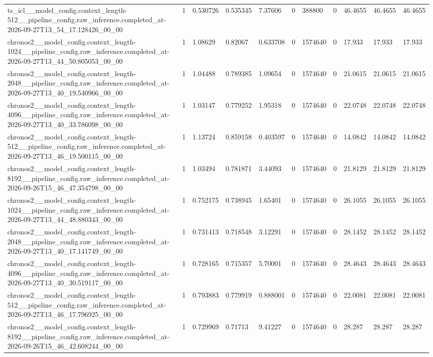 \begin{tabular}{lllllllllll}
ts\_icl\_\_model\_config.context\_length-512\_\_pipeline\_config.raw\_inference.completed\_at-2026-09-27T13\_54\_17.128426\_00\_00 & 1 & 0.530726 & 0.535345 & 7.37606 & 0 & 388800 & 0 & 46.4655 & 46.4655 & 46.4655 \\
chronos2\_\_model\_config.context\_length-1024\_\_pipeline\_config.raw\_inference.completed\_at-2026-09-27T13\_44\_50.805053\_00\_00 & 1 & 1.08629 & 0.82067 & 0.633708 & 0 & 1574640 & 0 & 17.933 & 17.933 & 17.933 \\
chronos2\_\_model\_config.context\_length-2048\_\_pipeline\_config.raw\_inference.completed\_at-2026-09-27T13\_40\_19.540966\_00\_00 & 1 & 1.04488 & 0.789385 & 1.09654 & 0 & 1574640 & 0 & 21.0615 & 21.0615 & 21.0615 \\
chronos2\_\_model\_config.context\_length-4096\_\_pipeline\_config.raw\_inference.completed\_at-2026-09-27T13\_40\_33.786098\_00\_00 & 1 & 1.03147 & 0.779252 & 1.95318 & 0 & 1574640 & 0 & 22.0748 & 22.0748 & 22.0748 \\
chronos2\_\_model\_config.context\_length-512\_\_pipeline\_config.raw\_inference.completed\_at-2026-09-27T13\_46\_19.500115\_00\_00 & 1 & 1.13724 & 0.859158 & 0.403597 & 0 & 1574640 & 0 & 14.0842 & 14.0842 & 14.0842 \\
chronos2\_\_model\_config.context\_length-8192\_\_pipeline\_config.raw\_inference.completed\_at-2026-09-26T15\_46\_47.354798\_00\_00 & 1 & 1.03494 & 0.781871 & 3.44093 & 0 & 1574640 & 0 & 21.8129 & 21.8129 & 21.8129 \\
chronos2\_\_model\_config.context\_length-1024\_\_pipeline\_config.raw\_inference.completed\_at-2026-09-27T13\_44\_48.880343\_00\_00 & 1 & 0.752175 & 0.738945 & 1.65401 & 0 & 1574640 & 0 & 26.1055 & 26.1055 & 26.1055 \\
chronos2\_\_model\_config.context\_length-2048\_\_pipeline\_config.raw\_inference.completed\_at-2026-09-27T13\_40\_17.141749\_00\_00 & 1 & 0.731413 & 0.718548 & 3.12291 & 0 & 1574640 & 0 & 28.1452 & 28.1452 & 28.1452 \\
chronos2\_\_model\_config.context\_length-4096\_\_pipeline\_config.raw\_inference.completed\_at-2026-09-27T13\_40\_30.519117\_00\_00 & 1 & 0.728165 & 0.715357 & 5.70001 & 0 & 1574640 & 0 & 28.4643 & 28.4643 & 28.4643 \\
chronos2\_\_model\_config.context\_length-512\_\_pipeline\_config.raw\_inference.completed\_at-2026-09-27T13\_46\_17.796925\_00\_00 & 1 & 0.793883 & 0.779919 & 0.888001 & 0 & 1574640 & 0 & 22.0081 & 22.0081 & 22.0081 \\
chronos2\_\_model\_config.context\_length-8192\_\_pipeline\_config.raw\_inference.completed\_at-2026-09-26T15\_46\_42.608244\_00\_00 & 1 & 0.729969 & 0.71713 & 9.41227 & 0 & 1574640 & 0 & 28.287 & 28.287 & 28.287 \\

\end{tabular}
